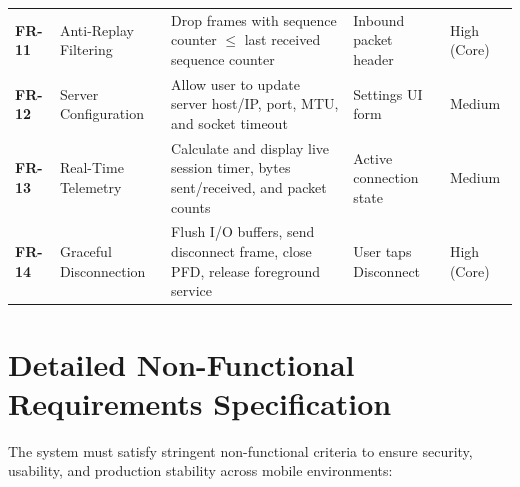 \begin{table}[htbp]
\begin{tabular}{@{}P{1.6cm}P{3.4cm}P{4.2cm}P{2.6cm}P{1.8cm}@{}}
    \addlinespace
    \textbf{FR-11} & Anti-Replay Filtering & Drop frames with sequence counter $\le$ last received sequence counter & Inbound packet header & High (Core) \\
    \addlinespace
    \textbf{FR-12} & Server Configuration & Allow user to update server host/IP, port, MTU, and socket timeout & Settings UI form & Medium \\
    \addlinespace
    \textbf{FR-13} & Real-Time Telemetry & Calculate and display live session timer, bytes sent/received, and packet counts & Active connection state & Medium \\
    \addlinespace
    \textbf{FR-14} & Graceful Disconnection & Flush I/O buffers, send disconnect frame, close PFD, release foreground service & User taps Disconnect & High (Core) \\
    \bottomrule
  \end{tabular}
\end{table}

\section{Detailed Non-Functional Requirements Specification}
\label{sec:detailed_nfr}

The system must satisfy stringent non-functional criteria to ensure security, usability, and production stability across mobile environments:


